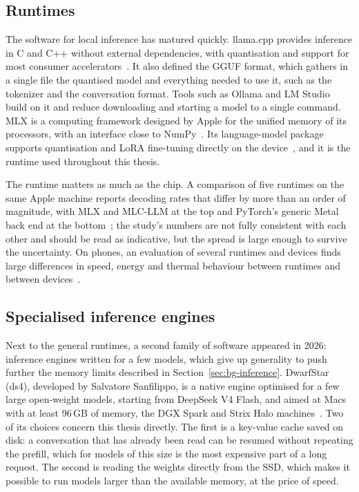 \subsection{Runtimes}
\label{sec:local-runtimes}

The software for local inference has matured quickly. llama.cpp provides inference in C and C++ without external
dependencies, with quantisation and support for most consumer accelerators~\cite{llamacpp}. It also defined the GGUF
format, which gathers in a single file the quantised model and everything needed to use it, such as the tokenizer and
the conversation format. Tools such as Ollama and LM Studio build on it and reduce downloading and starting a model to a
single command. MLX is a computing framework designed by Apple for the unified memory of its processors, with an
interface close to NumPy~\cite{mlx2023}. Its language-model package supports quantisation and LoRA fine-tuning directly
on the device~\cite{mlxlm}, and it is the runtime used throughout this thesis.

The runtime matters as much as the chip. A comparison of five runtimes on the same Apple machine reports decoding rates
that differ by more than an order of magnitude, with MLX and MLC-LLM at the top and PyTorch's generic Metal back end at
the bottom~\cite{rajesh2025apple}; the study's numbers are not fully consistent with each other and should be read as
indicative, but the spread is large enough to survive the uncertainty. On phones, an evaluation of several runtimes and
devices finds large differences in speed, energy and thermal behaviour between runtimes and between
devices~\cite{laskaridis2024melting}.

\subsection{Specialised inference engines}
\label{sec:local-engines}

Next to the general runtimes, a second family of software appeared in 2026: inference engines written for a few models,
which give up generality to push further the memory limits described in Section~\ref{sec:bg-inference}. DwarfStar (ds4),
developed by Salvatore Sanfilippo, is a native engine optimised for a few large open-weight models, starting from DeepSeek
V4 Flash, and aimed at Macs with at least 96\,GB of memory, the DGX Spark and Strix Halo machines~\cite{antirez2026ds4}.
Two of its choices concern this thesis directly. The first is a key-value cache saved on disk: a conversation that has
already been read can be resumed without repeating the prefill, which for models of this size is the most expensive part
of a long request. The second is reading the weights directly from the SSD, which makes it possible to run models larger
than the available memory, at the price of speed.

